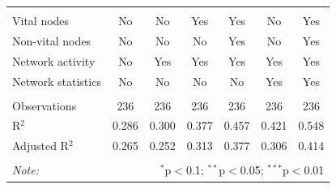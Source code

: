 \begin{table}[!htbp]
\begin{tabular}{@{\extracolsep{5pt}}lcccccc}
  & & & & & & \\ 
\hline \\[-1.8ex] 
Vital nodes & No & No & Yes & Yes & No & Yes \\ 
Non-vital nodes & No & No & No & Yes & No & Yes \\ 
Network activity & No & Yes & Yes & Yes & Yes & Yes \\ 
Network statistics & No & No & No & No & Yes & Yes \\ 
\hline &  &  &  &  &  &  \\ 
Observations & 236 & 236 & 236 & 236 & 236 & 236 \\ 
R$^{2}$ & 0.286 & 0.300 & 0.377 & 0.457 & 0.421 & 0.548 \\ 
Adjusted R$^{2}$ & 0.265 & 0.252 & 0.313 & 0.377 & 0.306 & 0.414 \\ 
\hline 
\hline \\[-1.8ex] 
\textit{Note:}  & \multicolumn{6}{r}{$^{*}$p$<$0.1; $^{**}$p$<$0.05; $^{***}$p$<$0.01} \\ 
\end{tabular} 
\end{table} 
